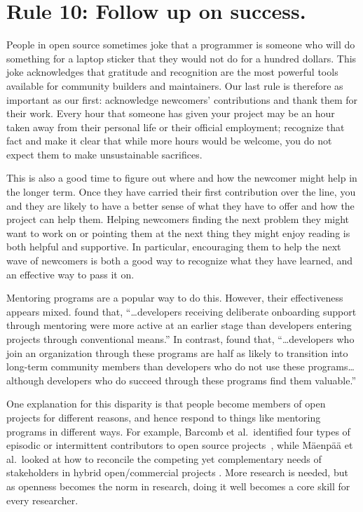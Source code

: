 \documentclass[10pt,letterpaper]{article}
\newcommand{\rulemajor}[1]{\section*{#1}}
\begin{document}
\rulemajor{Rule 10: Follow up on success.}

People in open source sometimes joke that
a programmer is someone who will do something for a laptop sticker
that they would not do for a hundred dollars.
This joke acknowledges that gratitude and recognition are the most powerful tools available for community builders and maintainers.
Our last rule is therefore as important as our first:
acknowledge newcomers' contributions and thank them for their work.
Every hour that someone has given your project may be an hour taken away from their personal life
or their official employment;
recognize that fact
and make it clear that while more hours would be welcome,
you do not expect them to make unsustainable sacrifices.

This is also a good time to figure out where and how the newcomer might help in the longer term.
Once they have carried their first contribution over the line,
you and they are likely to have a better sense of what they have to offer
and how the project can help them.
Helping newcomers finding the next problem they might want to work on
or pointing them at the next thing they might enjoy reading
is both helpful and supportive.
In particular,
encouraging them to help the next wave of newcomers
is both a good way to recognize what they have learned,
and an effective way to pass it on.

Mentoring programs are a popular way to do this.
However,
their effectiveness appears mixed.
\cite{fagerholm2014} found that,
``{\ldots}developers receiving deliberate onboarding support through mentoring
were more active at an earlier stage than developers entering projects through conventional means.''
In contrast,
\cite{labuschagne2015} found that,
``{\ldots}developers who join an organization through these programs
are half as likely to transition into long-term community members
than developers who do not use these programs{\ldots}
although developers who do succeed through these programs find them valuable.''

One explanation for this disparity is that people become members of open projects for different reasons,
and hence respond to things like mentoring programs in different ways.
For example,
Barcomb et al.\ identified four types of episodic or intermittent contributors to open source projects~\cite{barcomb2019},
while M\"{a}enp\"{a}\"{a} et al.\ looked at how to reconcile
the competing yet complementary needs of stakeholders in hybrid open/commercial projects \cite{maenpaa2018}.
More research is needed,
but as openness becomes the norm in research,
doing it well becomes a core skill for every researcher.


\end{document}
